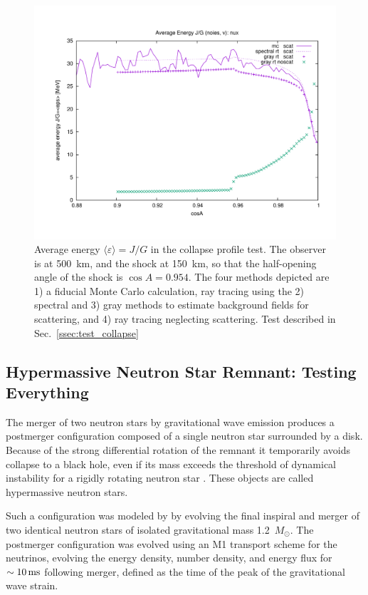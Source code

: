 \documentclass[aps,floatfix,prd,superscriptaddress,twocolumn]{revtex4-1}
\begin{document}
\begin{figure}
  \includegraphics[width=\columnwidth]{fig-collapse_profile-avg_eps_vs_cosA}
  \caption{Average energy $\langle\varepsilon\rangle=J/G$
    in the collapse profile test.
    The observer is at 500~km, and the shock at 150~km,
    so that the half-opening angle of the shock is $\cos A=0.954$.
    The four methods depicted are 1) a fiducial Monte Carlo calculation,
    ray tracing using the 2) spectral and 3) gray methods to estimate background
    fields for scattering, and 4) ray tracing neglecting scattering.
    Test described in Sec.~\ref{ssec:test_collapse}}
  \label{fig:avg_eps_collapse}
\end{figure}

\subsection{Hypermassive Neutron Star Remnant:
  Testing Everything}
\label{ssec:test_disk_comparison}
The merger of two neutron stars by gravitational wave emission produces a
postmerger configuration composed of a single neutron star surrounded by a disk.
Because of the strong differential rotation of the remnant it temporarily avoids
collapse to a black hole, even if its mass exceeds the threshold of dynamical
instability for a rigidly rotating neutron star \cite{duez2009-review}.
These objects are called hypermassive neutron stars.

Such a configuration was modeled by \cite{fouc2016-m1_nsns} by
evolving the final inspiral and merger of two identical neutron stars of
isolated gravitational mass 1.2~$M_{\odot}$. The postmerger configuration
was evolved using an M1 transport scheme for the neutrinos, evolving the
energy density, number density, and energy flux \cite{fouc2016-m1_evolve_n}
for $\sim10\,{\rm ms}$ following merger, defined as the time of the peak of the
gravitational wave strain.
\end{document}
